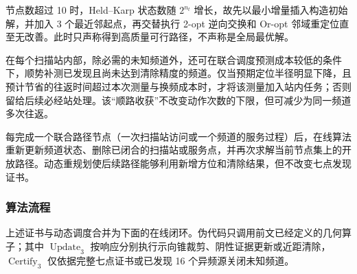 节点数超过 10 时，Held--Karp 状态数随 $2^{n_t}$ 增长，故先以最小增量插入构造初始解，并加入 3 个最近邻起点，再交替执行 2-opt 逆向交换和 Or-opt 邻域重定位直至无改善。此时只声称得到高质量可行路径，不声称是全局最优解。

在每个扫描站内部，除必需的未知频道外，还可在联合调度预测成本较低的条件下，顺势补测已发现且尚未达到清除精度的频道。仅当预期定位半径明显下降，且预计节省的往返时间超过本次测量与换频成本时，才将该测量加入站内任务；否则留给后续必经站处理。该“顺路收获”不改变动作次数的下限，但可减少为同一频道多次往返。

每完成一个联合路径节点（一次扫描站访问或一个频道的服务过程）后，在线算法重新更新频道状态、删除已闭合的扫描站或服务点，并再次求解当前节点集上的开放路径。动态重规划使后续路径能够利用新增方位和清除结果，但不改变七点发现证书。

\subsubsection{算法流程}

上述证书与动态调度合并为下面的在线闭环。伪代码只调用前文已经定义的几何算子；其中
$\operatorname{Update}_3$ 按响应分别执行示向锥裁剪、阴性证据更新或近距清除，
$\operatorname{Certify}_3$ 仅依据完整七点证书或已发现 16 个异频源关闭未知频道。

